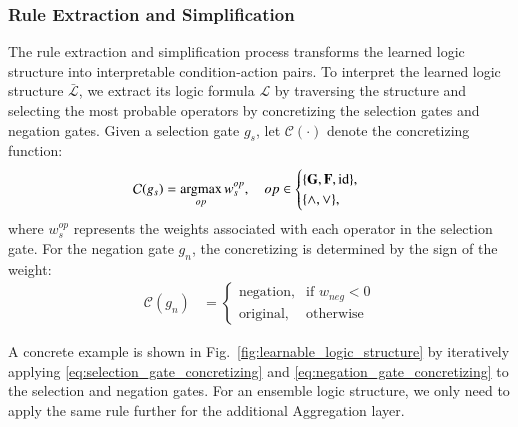 \subsubsection{Rule Extraction and Simplification}
\label{sec:rule_extraction_and_simplification}

The rule extraction and simplification process transforms the learned logic structure into interpretable condition-action pairs. To interpret the learned logic structure $\bar{\mathcal{L}}$, we extract its logic formula $\mathcal{L}$ by traversing the structure and selecting the most probable operators by concretizing the selection gates and negation gates. Given a selection gate $g_s$, let $\mathcal{C}(\cdot)$ denote the concretizing function:
\begin{equation}
    \begin{aligned}
        \mathcal{C}(g_s) & = \mathop{\mathrm{argmax}}_{op} w^{op}_s, \quad op \in \begin{cases}
                                                                     \{\mathbf{G}, \mathbf{F}, \text{id}\}, \\
                                                                     \{\land, \lor\},
                                                                 \end{cases}
    \end{aligned}
\end{equation}
\label{eq:selection_gate_concretizing}
where $w^{op}_s$ represents the weights associated with each operator in the selection gate.
For the negation gate $g_n$, the concretizing is determined by the sign of the weight:
\begin{equation}
    \begin{aligned}
        \mathcal{C}(g_n) & = \begin{cases}
                                 \text{negation}, & \text{if } w_{neg} < 0 \\
                                 \text{original}, & \text{otherwise}
                             \end{cases}
    \end{aligned}
\end{equation}
\label{eq:negation_gate_concretizing}

A concrete example is shown in Fig.~\ref{fig:learnable_logic_structure} by iteratively applying \eqref{eq:selection_gate_concretizing} and \eqref{eq:negation_gate_concretizing} to the selection and negation gates. For an ensemble logic structure, we only need to apply the same rule further for the additional Aggregation layer.


